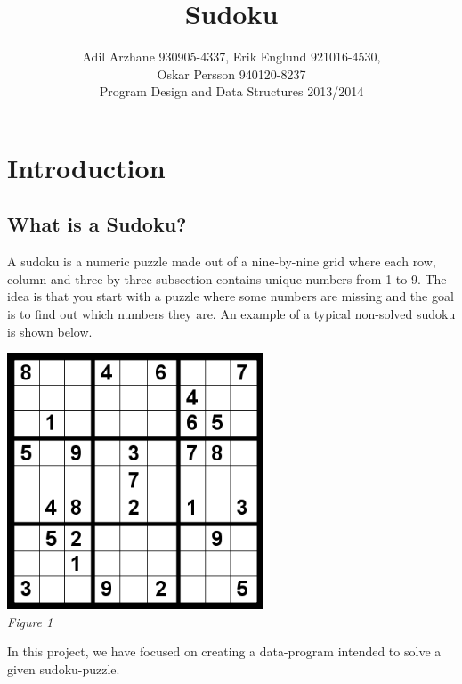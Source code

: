 \documentclass[12pt, a4paper]{article}
\begin{document}
	\title{
		\textbf{Sudoku}
	}

	\author{Adil Arzhane 930905-4337, Erik Englund 921016-4530, \\Oskar Persson 940120-8237\\Program Design and Data Structures 2013/2014}
	\maketitle

	\tableofcontents
	\newpage

	\section{Introduction}
	\begin{adjustwidth}{2em}{0pt}
		\subsection{What is a Sudoku?}
			\begin{adjustwidth}{3em}{0pt}
				A sudoku is a numeric puzzle made out of a nine-by-nine grid where each row, column and three-by-three-subsection contains unique numbers from 1 to 9. The idea is that you start with a puzzle where some numbers are missing and the goal is to find out which numbers they are. An example of a typical non-solved sudoku is shown below. \\
				\begin{center}
					\includegraphics[width=3in]{puzzle.png} \\ \textit{Figure 1}
				\end{center}

				In this project, we have focused on creating a data-program intended to solve a given sudoku-puzzle.
	  		\end{adjustwidth}
	\end{adjustwidth}
  	\newpage
\end{document}
